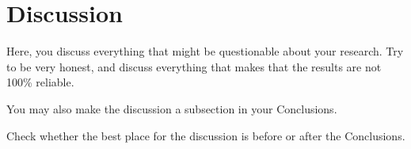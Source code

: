 \chapter{Discussion}
Here, you discuss everything that might be questionable about your research. Try to be very honest, and discuss everything that makes that the results are not 100\% reliable.

You may also make the discussion a subsection in your Conclusions.

Check whether the best place for the discussion is before or after the Conclusions.